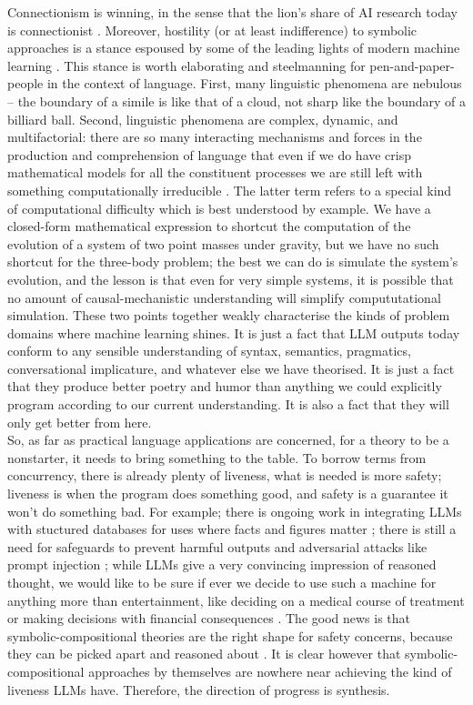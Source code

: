 Connectionism is winning, in the sense that the lion's share of AI research today is connectionist \citep{}. Moreover, hostility (or at least indifference) to symbolic approaches is a stance espoused by some of the leading lights of modern machine learning \citep{}. This stance is worth elaborating and steelmanning for pen-and-paper-people in the context of language. First, many linguistic phenomena are nebulous \citep{} -- the boundary of a simile is like that of a cloud, not sharp like the boundary of a billiard ball. Second, linguistic phenomena are complex, dynamic, and multifactorial: there are so many interacting mechanisms and forces in the production and comprehension of language that even if we do have crisp mathematical models for all the constituent processes we are still left with something computationally irreducible \citep{}. The latter term refers to a special kind of computational difficulty which is best understood by example. We have a closed-form mathematical expression to shortcut the computation of the evolution of a system of two point masses under gravity, but we have no such shortcut for the three-body problem; the best we can do is simulate the system's evolution, and the lesson is that even for very simple systems, it is possible that no amount of causal-mechanistic understanding will simplify compututational simulation. These two points together weakly characterise the kinds of problem domains where machine learning shines. It is just a fact that LLM outputs today conform to any sensible understanding of syntax, semantics, pragmatics, conversational implicature, and whatever else we have theorised. It is just a fact that they produce better poetry and humor than anything we could explicitly program according to our current understanding. It is also a fact that they will only get better from here.\\

So, as far as practical language applications are concerned, for a theory to be a nonstarter, it needs to bring something to the table. To borrow terms from concurrency, there is already plenty of liveness, what is needed is more safety; liveness is when the program does something good, and safety is a guarantee it won't do something bad. For example; there is ongoing work in integrating LLMs with stuctured databases for uses where facts and figures matter \citep{}; there is still a need for safeguards to prevent harmful outputs \citep{} and adversarial attacks like prompt injection \citep{}; while LLMs give a very convincing impression of reasoned thought, we would like to be sure if ever we decide to use such a machine for anything more than entertainment, like deciding on a medical course of treatment \citep{} or making decisions with financial consequences \citep{}. The good news is that symbolic-compositional theories are the right shape for safety concerns, because they can be picked apart and reasoned about \citep{}. It is clear however that symbolic-compositional approaches by themselves are nowhere near achieving the kind of liveness LLMs have. Therefore, the direction of progress is synthesis.\\


